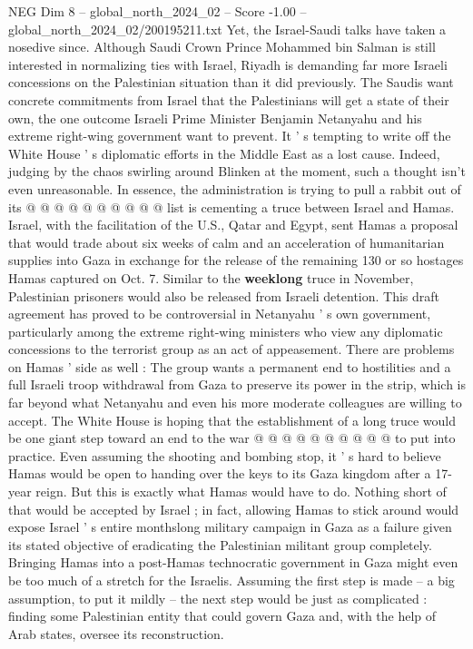 \begin{textsample}{NEG Dim 8 – global\_north\_2024\_02 – Score -1.00 – global\_north\_2024\_02/200195211.txt}
Yet, the Israel-Saudi talks have taken a nosedive since.
Although Saudi Crown Prince Mohammed bin Salman is still interested in normalizing ties with Israel, Riyadh is demanding far more Israeli concessions on the Palestinian situation than it did previously.
The Saudis want concrete commitments from Israel that the Palestinians will get a state of their own, the one outcome Israeli Prime Minister Benjamin Netanyahu and his extreme right-wing government want to prevent.
It ' s tempting to write off the White House ' s diplomatic efforts in the Middle East as a lost cause.
Indeed, judging by the chaos swirling around Blinken at the moment, such a thought isn't even unreasonable.
In essence, the administration is trying to pull a rabbit out of its @ @ @ @ @ @ @ @ @ @ list is cementing a truce between Israel and Hamas.
Israel, with the facilitation of the U.S., Qatar and Egypt, sent Hamas a proposal that would trade about six weeks of calm and an acceleration of humanitarian supplies into Gaza in exchange for the release of the remaining 130 or so hostages Hamas captured on Oct. 7.
Similar to the \textbf{weeklong} truce in November, Palestinian prisoners would also be released from Israeli detention.
This draft agreement has proved to be controversial in Netanyahu ' s own government, particularly among the extreme right-wing ministers who view any diplomatic concessions to the terrorist group as an act of appeasement.
There are problems on Hamas ' side as well : The group wants a permanent end to hostilities and a full Israeli troop withdrawal from Gaza to preserve its power in the strip, which is far beyond what Netanyahu and even his more moderate colleagues are willing to accept.
The White House is hoping that the establishment of a long truce would be one giant step toward an end to the war @ @ @ @ @ @ @ @ @ @ to put into practice.
Even assuming the shooting and bombing stop, it ' s hard to believe Hamas would be open to handing over the keys to its Gaza kingdom after a 17-year reign.
But this is exactly what Hamas would have to do.
Nothing short of that would be accepted by Israel ; in fact, allowing Hamas to stick around would expose Israel ' s entire monthslong military campaign in Gaza as a failure given its stated objective of eradicating the Palestinian militant group completely.
Bringing Hamas into a post-Hamas technocratic government in Gaza might even be too much of a stretch for the Israelis.
Assuming the first step is made -- a big assumption, to put it mildly -- the next step would be just as complicated : finding some Palestinian entity that could govern Gaza and, with the help of Arab states, oversee its reconstruction.

\end{textsample}
